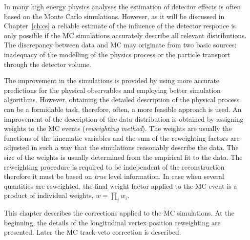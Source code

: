  In many high energy physics analyses the estimation of detector effects is often based on the Monte Carlo simulations. However, as it will be discussed in Chapter~\ref{ch:cs} a reliable estimate of the influence of the detector responce is only possible if the MC simulations accurately describe all relevant distributions. %
 The discrepancy between data and MC may originate from two basic sources: inadequacy of the modelling of the physics process or the particle transport through the detector volume.
 
 The improvement in the simulations is provided by using more accurate predictions for the physical observables and employing better simulation algorithms. However, obtaining the detailed description of the physical process can be a formidable task, therefore, often, a more feasible approach is used. An improvement of the description of the data distribution is obtained by assigning weights to the MC events (\emph{reweighting method}). The weights are usually the functions of the kinematic variables and the sum of the reweighting factors are adjusted in such a way that the simulations reasonably describe the data. The size of the weights is usually determined from the empirical fit to the data. The reweighting procedure is required to be independent of the reconstruction therefore it must be based on \emph{true} level information. In case when several quantities are reweighted, the final weight factor applied to the MC event is a product of individual weights, $w = \prod_i w_i$.
 
 This chapter describes the corrections applied to the MC simulations. At the beginning, the details of the longitudinal vertex position reweighting are presented. Later the MC track-veto correction is described. 
 
